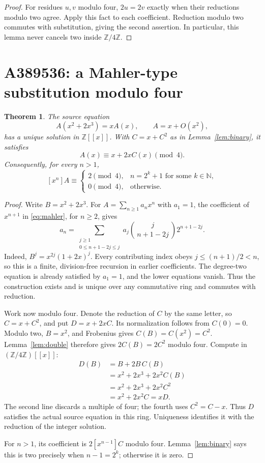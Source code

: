 \documentclass[11pt,a4paper]{article}
\newtheorem{theorem}{Theorem}[section]
\theoremstyle{remark}
\newcommand{\Z}{\mathbb Z}
\newcommand{\N}{\mathbb N}
\newcommand{\ps}[1]{#1[[x]]}
\begin{document}
\begin{proof}
For residues $u,v$ modulo four, $2u=2v$ exactly when their reductions modulo
two agree. Apply this fact to each coefficient. Reduction modulo two
commutes with substitution, giving the second assertion. In particular,
this lemma never cancels two inside $\Z/4\Z$.
\end{proof}

\section{A389536: a Mahler-type substitution modulo four}

\begin{theorem}\label{thm:mahler}
The source equation
\begin{equation}\label{eq:mahler}
 A(x^2+2x^3)=xA(x),\qquad A=x+O(x^2),
\end{equation}
has a unique solution in $\ps{\Z}$. With $C=x+C^2$ as in
Lemma~\ref{lem:binary}, it satisfies
\[
 A(x)\equiv x+2xC(x)\pmod4.
\]
Consequently, for every $n>1$,
\[
 [x^n]A\equiv
 \begin{cases}
  2\pmod4,&n=2^k+1\text{ for some }k\in\N,\\
  0\pmod4,&\text{otherwise}.
 \end{cases}
\]
\end{theorem}

\begin{proof}
Write $B=x^2+2x^3$. For $A=\sum_{n\ge1}a_nx^n$ with $a_1=1$, the
coefficient of $x^{n+1}$ in \eqref{eq:mahler}, for $n\ge2$, gives
\begin{equation}\label{eq:mahlerrec}
 a_n=
 \sum_{\substack{j\ge1\\0\le n+1-2j\le j}}
 a_j\binom{j}{\,n+1-2j\,}2^{n+1-2j}.
\end{equation}
Indeed, $B^j=x^{2j}(1+2x)^j$. Every contributing index obeys
$j\le(n+1)/2<n$, so this is a finite, division-free recursion in earlier
coefficients. The degree-two equation is already satisfied by $a_1=1$,
and the lower equations vanish. Thus the construction exists and is
unique over any commutative ring and commutes with reduction.

Work now modulo four. Denote the reduction of $C$ by the same letter,
so $C=x+C^2$, and put $D=x+2xC$. Its normalization follows from $C(0)=0$.
Modulo two, $B=x^2$, and Frobenius gives $C(B)=C(x^2)=C^2$.
Lemma~\ref{lem:double} therefore gives $2C(B)=2C^2$ modulo four. Compute
in $(\Z/4\Z)[[x]]$:
\begin{align*}
 D(B)
 &=B+2B\,C(B)\\
 &=x^2+2x^3+2x^2C(B)\\
 &=x^2+2x^3+2x^2C^2\\
 &=x^2+2x^2C=xD.
\end{align*}
The second line discards a multiple of four; the fourth uses $C^2=C-x$.
Thus $D$ satisfies the actual source equation in this ring. Uniqueness
identifies it with the reduction of the integer solution.

For $n>1$, its coefficient is $2[x^{n-1}]C$ modulo four.
Lemma~\ref{lem:binary} says this is two precisely when $n-1=2^k$;
otherwise it is zero.
\end{proof}
\end{document}
